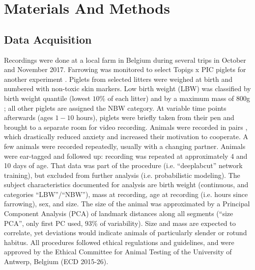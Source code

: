 \FloatBarrier
\clearpage
\section{Materials And Methods}
\label{methods_22}

\subsection{Data Acquisition}
\label{sec:orgd0bae22}

Recordings were done at a local farm in Belgium during several trips in October and November 2017.
Farrowing was monitored to select Topigs x PIC piglets for another experiment \citep{Ayuso2021}.
Piglets from selected litters were weighed at birth and numbered with non-toxic skin markers.
Low birth weight (LBW) was classified by birth weight quantile (lowest \(10 \%\) of each litter) and by a maximum mass of \(800\)g \citep{Litten2003,VanTichelen2021,Wang2016,DInca2011}; all other piglets are assigned the NBW category.
At variable time points afterwards (ages \(1 - 10\) hours), piglets were briefly taken from their pen and brought to a separate room for video recording.
Animals were recorded in pairs \citep[as in][]{Mielke2018}, which drastically reduced anxiety and increased their motivation to cooperate.
A few animals were recorded repeatedly, usually with a changing partner.
Animals were ear-tagged and followed up: recording was repeated at approximately 4 and 10 days of age.
That data was part of the  procedure (i.e. ``deeplabcut'' network training), but excluded from further analysis (i.e. probabilistic modeling).
The subject characteristics documented for analysis are birth weight (continuous, and categories ``LBW''/``NBW''), mass at recording, age at recording (i.e. hours since farrowing), sex, and size.
The size of the animal was approximated by a Principal Component Analysis (PCA) of landmark distances along all segments (``size PCA'', only first PC used,
\(93 \%\)
of variability).
Size and mass are expected to correlate, yet deviations would indicate animals of particularly slender or rotund habitus.
All procedures followed ethical regulations and guidelines, and were approved by the Ethical Committee for Animal Testing of the University of Antwerp, Belgium (ECD 2015-26).



